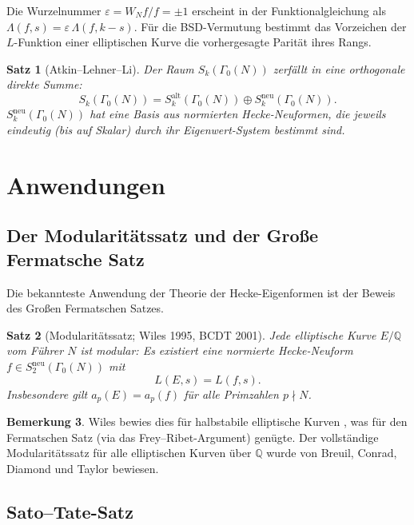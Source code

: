 \documentclass[12pt,a4paper]{amsart}
\newtheorem{theorem}{Satz}[section]
\theoremstyle{definition}
\newtheorem{bemerkung}[theorem]{Bemerkung}
\begin{document}
Die Wurzelnummer $\varepsilon = W_N f / f = \pm 1$ erscheint in der Funktionalgleichung
als $\Lambda(f,s) = \varepsilon\,\Lambda(f,k-s)$. F\"ur die BSD-Vermutung bestimmt
das Vorzeichen der $L$-Funktion einer elliptischen Kurve die vorhergesagte Parit\"at
ihres Rangs.

\begin{theorem}[Atkin--Lehner--Li]\label{thm:al-li}
  Der Raum $S_k(\Gamma_0(N))$ zerf\"allt in eine orthogonale direkte Summe:
  \[
    S_k(\Gamma_0(N)) = S_k^{\mathrm{alt}}(\Gamma_0(N)) \oplus S_k^{\mathrm{neu}}(\Gamma_0(N)).
  \]
  $S_k^{\mathrm{neu}}(\Gamma_0(N))$ hat eine Basis aus normierten Hecke-Neuformen,
  die jeweils eindeutig (bis auf Skalar) durch ihr Eigenwert-System bestimmt sind.
\end{theorem}

\section{Anwendungen}

\subsection{Der Modularit\"atssatz und der Gro{\ss}e Fermatsche Satz}

Die bekannteste Anwendung der Theorie der Hecke-Eigenformen ist der Beweis
des Gro{\ss}en Fermatschen Satzes.

\begin{theorem}[Modularit\"atssatz; Wiles 1995, BCDT 2001]\label{thm:modularitaet}
  Jede elliptische Kurve $E/\mathbb{Q}$ vom F\"uhrer $N$ ist modular: Es existiert
  eine normierte Hecke-Neuform $f \in S_2^{\mathrm{neu}}(\Gamma_0(N))$ mit
  \[
    L(E,s) = L(f,s).
  \]
  Insbesondere gilt $a_p(E) = a_p(f)$ f\"ur alle Primzahlen $p \nmid N$.
\end{theorem}

\begin{bemerkung}
  Wiles bewies dies f\"ur halbstabile elliptische Kurven \cite{Wiles95}, was
  f\"ur den Fermatschen Satz (via das Frey--Ribet-Argument) gen\"ugte. Der
  vollst\"andige Modularit\"atssatz f\"ur alle elliptischen Kurven \"uber $\mathbb{Q}$
  wurde von Breuil, Conrad, Diamond und Taylor \cite{BCDT} bewiesen.
\end{bemerkung}

\subsection{Sato--Tate-Satz}
\end{document}
